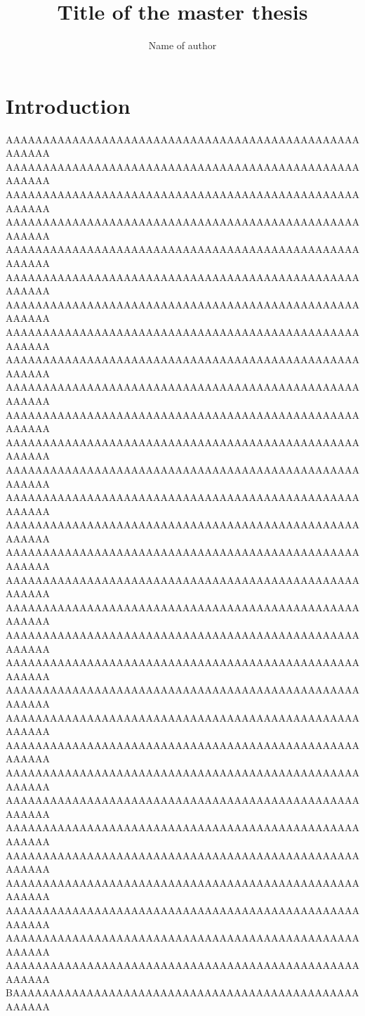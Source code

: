 \documentclass[final,10pt]{../../uit-thesis}
\begin{document}

\title{Title of the master thesis}
\author{Name of author}


\maketitle

\frontmatter

\tableofcontents


\printglossaries
{}

\mainmatter

\chapter{Introduction}
AAAAAAAAAAAAAAAAAAAAAAAAAAAAAAAAAAAAAAAAAAAAAAAAAAAAAA
AAAAAAAAAAAAAAAAAAAAAAAAAAAAAAAAAAAAAAAAAAAAAAAAAAAAAA
AAAAAAAAAAAAAAAAAAAAAAAAAAAAAAAAAAAAAAAAAAAAAAAAAAAAAA
AAAAAAAAAAAAAAAAAAAAAAAAAAAAAAAAAAAAAAAAAAAAAAAAAAAAAA
AAAAAAAAAAAAAAAAAAAAAAAAAAAAAAAAAAAAAAAAAAAAAAAAAAAAAA
AAAAAAAAAAAAAAAAAAAAAAAAAAAAAAAAAAAAAAAAAAAAAAAAAAAAAA
AAAAAAAAAAAAAAAAAAAAAAAAAAAAAAAAAAAAAAAAAAAAAAAAAAAAAA
AAAAAAAAAAAAAAAAAAAAAAAAAAAAAAAAAAAAAAAAAAAAAAAAAAAAAA
AAAAAAAAAAAAAAAAAAAAAAAAAAAAAAAAAAAAAAAAAAAAAAAAAAAAAA
AAAAAAAAAAAAAAAAAAAAAAAAAAAAAAAAAAAAAAAAAAAAAAAAAAAAAA
AAAAAAAAAAAAAAAAAAAAAAAAAAAAAAAAAAAAAAAAAAAAAAAAAAAAAA
AAAAAAAAAAAAAAAAAAAAAAAAAAAAAAAAAAAAAAAAAAAAAAAAAAAAAA
AAAAAAAAAAAAAAAAAAAAAAAAAAAAAAAAAAAAAAAAAAAAAAAAAAAAAA
AAAAAAAAAAAAAAAAAAAAAAAAAAAAAAAAAAAAAAAAAAAAAAAAAAAAAA
AAAAAAAAAAAAAAAAAAAAAAAAAAAAAAAAAAAAAAAAAAAAAAAAAAAAAA
AAAAAAAAAAAAAAAAAAAAAAAAAAAAAAAAAAAAAAAAAAAAAAAAAAAAAA
AAAAAAAAAAAAAAAAAAAAAAAAAAAAAAAAAAAAAAAAAAAAAAAAAAAAAA
AAAAAAAAAAAAAAAAAAAAAAAAAAAAAAAAAAAAAAAAAAAAAAAAAAAAAA
AAAAAAAAAAAAAAAAAAAAAAAAAAAAAAAAAAAAAAAAAAAAAAAAAAAAAA
AAAAAAAAAAAAAAAAAAAAAAAAAAAAAAAAAAAAAAAAAAAAAAAAAAAAAA
AAAAAAAAAAAAAAAAAAAAAAAAAAAAAAAAAAAAAAAAAAAAAAAAAAAAAA
AAAAAAAAAAAAAAAAAAAAAAAAAAAAAAAAAAAAAAAAAAAAAAAAAAAAAA
AAAAAAAAAAAAAAAAAAAAAAAAAAAAAAAAAAAAAAAAAAAAAAAAAAAAAA
AAAAAAAAAAAAAAAAAAAAAAAAAAAAAAAAAAAAAAAAAAAAAAAAAAAAAA
AAAAAAAAAAAAAAAAAAAAAAAAAAAAAAAAAAAAAAAAAAAAAAAAAAAAAA
AAAAAAAAAAAAAAAAAAAAAAAAAAAAAAAAAAAAAAAAAAAAAAAAAAAAAA
AAAAAAAAAAAAAAAAAAAAAAAAAAAAAAAAAAAAAAAAAAAAAAAAAAAAAA
AAAAAAAAAAAAAAAAAAAAAAAAAAAAAAAAAAAAAAAAAAAAAAAAAAAAAA
AAAAAAAAAAAAAAAAAAAAAAAAAAAAAAAAAAAAAAAAAAAAAAAAAAAAAA
AAAAAAAAAAAAAAAAAAAAAAAAAAAAAAAAAAAAAAAAAAAAAAAAAAAAAA
AAAAAAAAAAAAAAAAAAAAAAAAAAAAAAAAAAAAAAAAAAAAAAAAAAAAAA
BAAAAAAAAAAAAAAAAAAAAAAAAAAAAAAAAAAAAAAAAAAAAAAAAAAAAA
\end{document}
